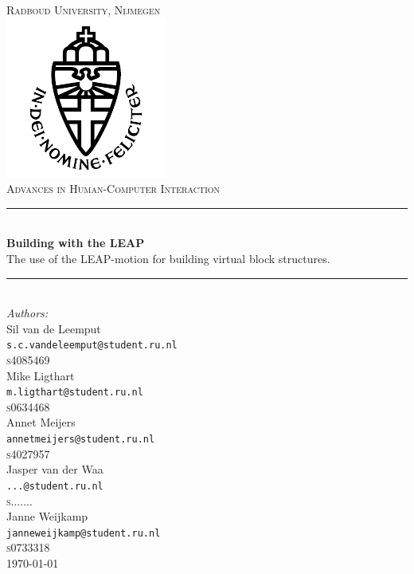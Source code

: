 \newcommand{\HRule}{\rule{\linewidth}{0.5mm}}

\begin{titlepage}

\begin{center}



\textsc{\LARGE Radboud University, Nijmegen}\\

\includegraphics[scale=0.8]{imgs/rulogo.png}\\[1cm]

\textsc{\Large Advances in Human-Computer Interaction}\\[0.5cm]



\HRule \\[0.4cm]
{ \huge \bfseries Building with the LEAP}\\[0.3cm]
{\Large The use of the LEAP-motion for building virtual block structures.}

\HRule \\[1cm]

{\large \emph{Authors:}\\[0.2cm]
Sil van de Leemput\\
\texttt{s.c.vandeleemput@student.ru.nl}\\[0.08cm]
\textsc{s4085469}\\[0.5cm]
Mike Ligthart\\
\texttt{m.ligthart@student.ru.nl}\\[0.08cm]
\textsc{s0634468}\\[0.5cm]
Annet Meijers\\
\texttt{annetmeijers@student.ru.nl}\\[0.08cm]
\textsc{s4027957}\\[0.5cm]
Jasper van der Waa\\
\texttt{...@student.ru.nl}\\[0.08cm]
\textsc{s.......}\\[0.5cm]
Janne Weijkamp\\
\texttt{janneweijkamp@student.ru.nl}\\[0.08cm]
\textsc{s0733318}}\\[2cm]
\today
\end{center}

\end{titlepage}